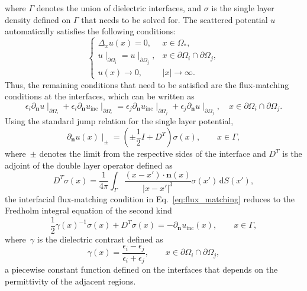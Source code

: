 \documentclass[preprint,12pt]{elsarticle}
\newcommand{\V}[1]{\boldsymbol{#1}}
\newcommand{\abs}[1]{\left|#1\right|}
\begin{document}
where $\Gamma$ denotes the union of dielectric interfaces, and $\sigma$ is the single layer density defined on $\Gamma$ that needs to be solved for.
The scattered potential $u$ automatically satisfies the following conditions:
\begin{equation}
    \begin{cases}
        \Delta_x u(x) = 0, & x \in \Omega_*,\\
        u\mid_{\partial \Omega_i} = u\mid_{\partial \Omega_j}, &
            x \in \partial\Omega_i \cap \partial\Omega_j,\\
        u(x) \to 0, & \abs{x} \to \infty.
    \end{cases}
\end{equation}
Thus, the remaining conditions that need to be satisfied are the flux-matching conditions at the interfaces, which can be written as
\begin{equation}\label{eq:flux_matching}
    \epsilon_i \partial_{\V n} u\mid_{\partial \Omega_i} + \epsilon_i \partial_{\V n} u_{\text{inc}}\mid_{\partial \Omega_i}
        = \epsilon_j \partial_{\V n} u_{\text{inc}}\mid_{\partial \Omega_j} + \epsilon_j \partial_{\V n} u\mid_{\partial \Omega_j}, 
            \quad x \in \partial\Omega_i \cap \partial\Omega_j.
\end{equation}
Using the standard jump relation for the single layer potential,
\begin{equation}
    \partial_{\V n} u(x) \mid_{\pm} = \left(\pm \frac{1}{2}I + D^T\right)\sigma(x), \qquad x \in \Gamma,
\end{equation}
where~$\pm$ denotes the limit from the respective sides of the interface and $D^T$ is the adjoint of the double layer operator defined as
\begin{equation}
    D^T \sigma(x) = \frac{1}{4\pi}\int_\Gamma \frac{(x-x')\cdot \V n(x)}{\abs{x-x'}^3}\sigma(x')\, \mathrm{d}S(x'),
\end{equation}
the interfacial flux-matching condition in Eq.~\eqref{eq:flux_matching} reduces to the Fredholm integral equation of the second kind~\cite{greengard1994numerical}
\begin{equation}\label{eq:sl}
    \frac{1}{2}\gamma(x)^{-1} \sigma(x) + D^T \sigma(x) = -\partial_{\V n} u_{\text{inc}}(x), \qquad x \in \Gamma,
\end{equation}
where~$\gamma$ is the dielectric contrast defined as
\begin{equation}
    \gamma(x) = \frac{\epsilon_i - \epsilon_j}{\epsilon_i + \epsilon_j}, \qquad x \in \partial\Omega_i \cap \partial\Omega_j, 
\end{equation}
a piecewise constant function defined on the interfaces that depends on the permittivity of the adjacent regions.
\end{document}
